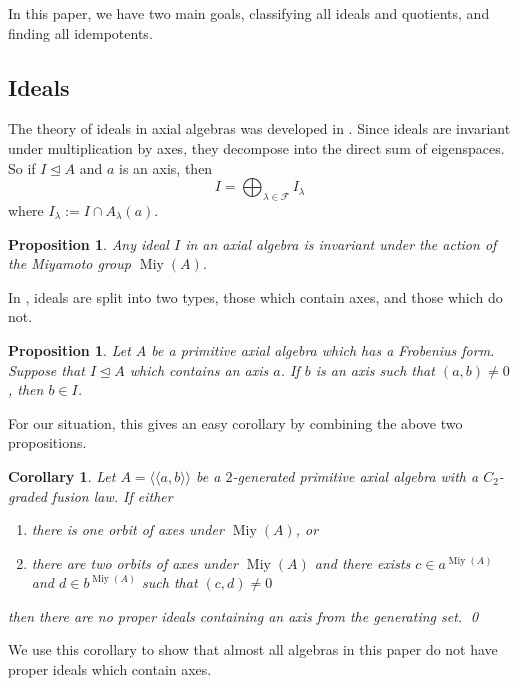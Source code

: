 \documentclass[11pt, a4paper]{article}
\theoremstyle{plain}
\newtheorem{corollary}[theorem]{Corollary}
\newtheorem{proposition}[theorem]{Proposition}
\theoremstyle{definition}
\newcommand\lm{\lambda}
\newcommand\cF{\mathcal{F}}
\newcommand\lla{\langle\!\langle}
\newcommand\rra{\rangle\!\rangle}
\DeclareMathOperator{\Miy}{Miy}
\newcommand{\0}{\overline{0}}
\newcommand{\2}{\overline{2}}
\newcommand{\1}{\mathbbm{1}}
\begin{document}
In this paper, we have two main goals, classifying all ideals and quotients, and finding all idempotents.

\subsection{Ideals}

The theory of ideals in axial algebras was developed in \cite{axialstructure}.  Since ideals are invariant under multiplication by axes, they decompose into the direct sum of eigenspaces.  So if $I \unlhd A$ and $a$ is an axis, then
\[
I = \bigoplus_{\lm \in \cF} I_\lm
\]
where $I_\lm := I \cap A_\lm(a)$.

\begin{proposition}\textup{\cite[Corollary 3.11]{axialstructure}}
Any ideal $I$ in an axial algebra is invariant under the action of the Miyamoto group $\Miy(A)$.
\end{proposition}

In \cite{axialstructure}, ideals are split into two types, those which contain axes, and those which do not.

\begin{proposition}\textup{\cite[Lemmas 4.14 and 4.17]{axialstructure}}
Let $A$ be a primitive axial algebra which has a Frobenius form.  Suppose that $I \unlhd A$ which contains an axis $a$.  If $b$ is an axis such that $(a,b) \neq 0$, then $b \in I$.
\end{proposition}

For our situation, this gives an easy corollary by combining the above two propositions.

\begin{corollary}\label{axisideal}
	Let $A = \lla a, b \rra$ be a $2$-generated primitive axial algebra with a $C_2$-graded fusion law. If either
	\begin{enumerate}
		\item there is one orbit of axes under $\Miy(A)$, or 
		
		\item there are two orbits of axes under $\Miy(A)$ and there exists $c \in a^{\Miy(A)}$ and $d \in b^{\Miy(A)}$ such that $(c, d) \neq 0$		
	\end{enumerate}
	then there are no proper ideals containing an axis from the generating set. \qed
\end{corollary}

We use this corollary to show that almost all algebras in this paper do not have proper ideals which contain axes.
\end{document}
